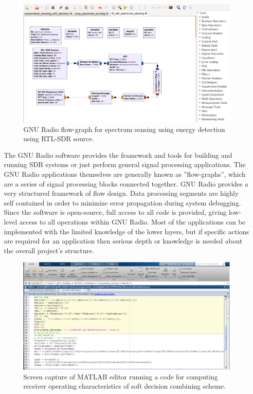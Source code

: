 \begin{figure}[ht!]
	\centering
	\includegraphics[width=\textwidth,keepaspectratio]{images/Gill/figs/gnuflowgraph.eps}
    \caption{GNU Radio flow-graph for spectrum sensing using energy detection using RTL-SDR source.}
\label{gnuradioflowgraph}      
\end{figure}

The GNU Radio software provides the framework and tools for building and running SDR systems or just perform general signal processing applications. The GNU Radio applications themselves are generally known as ''flow-graphs'', which are a series of signal processing blocks connected together. GNU Radio provides a very structured framework of flow design. Data processing segments are highly self contained in order to minimize error propagation during system debugging. Since the software is open-source, full access to all code is provided, giving low-level access to all operations within GNU Radio. Most of the applications can be implemented with the limited knowledge of the lower layers, but if specific actions are required for an application then serious depth or knowledge is needed about the overall project’s structure.

\begin{figure}[ht!]
	\centering
	\includegraphics[width=\textwidth,keepaspectratio]{images/Gill/figs/matlab.eps}
    \caption{Screen capture of MATLAB editor running a code for computing receiver operating characteristics of soft decision combining scheme.}
\label{matlab}      
\end{figure}

